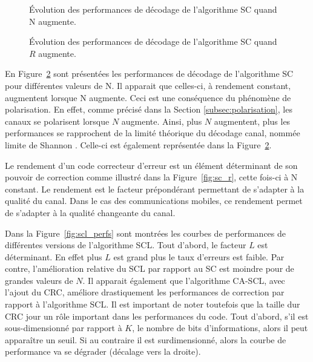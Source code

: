 \begin{figure}[t]

\caption{\'Evolution des performances de décodage de l'algorithme SC quand N augmente.}
\label{fig:sc_n}
\end{figure}

\begin{figure}[t]

\caption{\'Evolution des performances de décodage de l'algorithme SC quand $R$ augmente.}
\label{fig:sc_n}
\end{figure}

En Figure~\ref{fig:sc_n} sont présentées les performances de décodage de l'algorithme SC pour différentes valeurs de N. Il apparait que celles-ci, à rendement constant, augmentent lorsque N augmente. Ceci est une conséquence du phénomène de polarisation. En effet, comme précisé dans la Section \ref{subsec:polarisation}, les canaux se polarisent lorsque $N$ augmente. Ainsi, plus $N$ augmentent, plus les performances se rapprochent de la limité théorique du décodage canal, nommée limite de Shannon \cite{shannon_mathematical_2001}. Celle-ci est également représentée dans la Figure~\ref{fig:sc_n}.

Le rendement d'un code correcteur d'erreur est un élément déterminant de son pouvoir de correction comme illustré dans la Figure~\ref{fig:sc_r}, cette fois-ci à N constant. Le rendement est le facteur prépondérant permettant de s'adapter à la qualité du canal. Dans le cas des communications mobiles, ce rendement permet de s'adapter à la qualité changeante du canal.

% 
Dans la Figure~\ref{fig:scl_perfs} sont montrées les courbes de performances de différentes versions de l'algorithme SCL. Tout d'abord, le facteur $L$ est déterminant. En effet plus $L$ est grand plus le taux d'erreurs est faible. Par contre, l'amélioration relative du SCL par rapport au SC est moindre pour de grandes valeurs de $N$. Il apparait également que l'algorithme CA-SCL, avec l'ajout du CRC, améliore drastiquement les performances de correction par rapport à l'algorithme SCL. Il est important de noter toutefois que la taille dur CRC jour un rôle important dans les performances du code. Tout d'abord, s'il est sous-dimensionné par rapport à $K$, le nombre de bits d'informations, alors il peut apparaître un seuil. Si au contraire il est surdimensionné, alors la courbe de performance va se dégrader (décalage vers la droite).



